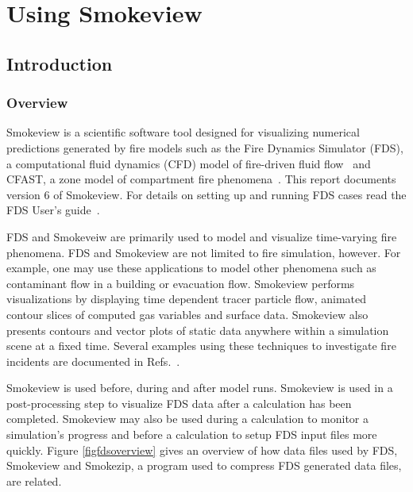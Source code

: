 \documentclass[11pt,twoside]{book}
\begin{document}
\tableofcontents
\listoffigures
\listoftables

\mainmatter



\part{Using Smokeview}
\chapter{Introduction}
\section{Overview}
Smokeview is a scientific software tool designed for visualizing
numerical predictions generated by fire models such as the Fire
Dynamics Simulator (FDS), a computational fluid dynamics (CFD)
model of fire-driven fluid flow~\cite{FDS_Tech_Guide} and CFAST, a
zone model of compartment fire phenomena~\cite{Jones:2004A}. This
report documents version 6 of Smokeview. For details on setting up
and running FDS cases read the FDS User's
guide~\cite{FDS_Users_Guide}.

FDS and Smokeveiw are primarily used to model and visualize
time-varying fire phenomena. FDS and Smokeview are not limited to
fire simulation, however. For example, one may use these
applications to model other phenomena such as contaminant flow in
a building or evacuation flow. Smokeview performs visualizations
by displaying time dependent tracer particle flow, animated
contour slices of computed gas variables and surface data.
Smokeview also presents contours and vector plots of static data
anywhere within a simulation scene at a fixed time. Several
examples using these techniques to investigate fire incidents are
documented in Refs.~\cite{CHERRYROAD,Iowa,HOUSTON,WTC}.

Smokeview is used before, during and after model runs. Smokeview
is used in a post-processing step to visualize FDS data after a
calculation has been completed. Smokeview  may also be used during
a calculation to monitor a simulation's progress and before a
calculation to setup FDS input files more quickly.  Figure
\ref{figfdsoverview} gives an overview of how data files used by
FDS,  Smokeview and Smokezip, a program used to compress FDS
generated data files, are related.
\end{document}
